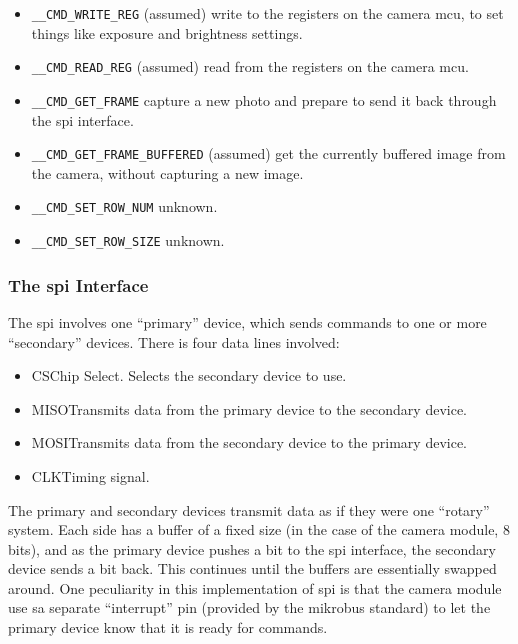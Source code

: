 \begin{itemize}
  \item \texttt{\_\_CMD\_WRITE\_REG} (assumed) write to the registers on the
  camera \acrfull{mcu}, to set things like exposure and brightness settings.
  \item \texttt{\_\_CMD\_READ\_REG} (assumed) read from the registers on the
  camera \acrshort{mcu}.
  \item \texttt{\_\_CMD\_GET\_FRAME} capture a new photo and prepare to send
  it back through the \acrshort{spi} interface.
  \item \texttt{\_\_CMD\_GET\_FRAME\_BUFFERED} (assumed) get the currently
  buffered image from the camera, without capturing a new image.
  \item \texttt{\_\_CMD\_SET\_ROW\_NUM} unknown.
  \item \texttt{\_\_CMD\_SET\_ROW\_SIZE} unknown.
\end{itemize}

\subsubsection{The \acrshort{spi} Interface}
The \acrshort{spi} involves one ``primary'' device, which sends commands to
one or more ``secondary'' devices. There is four data lines involved:

\begin{itemize}
  \item CS\textemdash{}Chip Select. Selects the secondary device to use.
  \item MISO\textemdash{}Transmits data from the primary device to the
  secondary device.
  \item MOSI\textemdash{}Transmits data from the secondary device to the
  primary device.
  \item CLK\textemdash{}Timing signal.
\end{itemize}

The primary and secondary devices transmit data as if they were one
``rotary'' system. Each side has a buffer of a fixed size (in the case of the
camera module, 8 bits), and as the primary device pushes a bit to the
\acrshort{spi} interface, the secondary device sends a bit back. This
continues until the buffers are essentially swapped around. One peculiarity in this implementation of \acrshort{spi} is that
the camera module use sa separate ``interrupt'' pin (provided by the
\gls{mikrobus} standard) to let the primary device know that it is ready for
commands.

